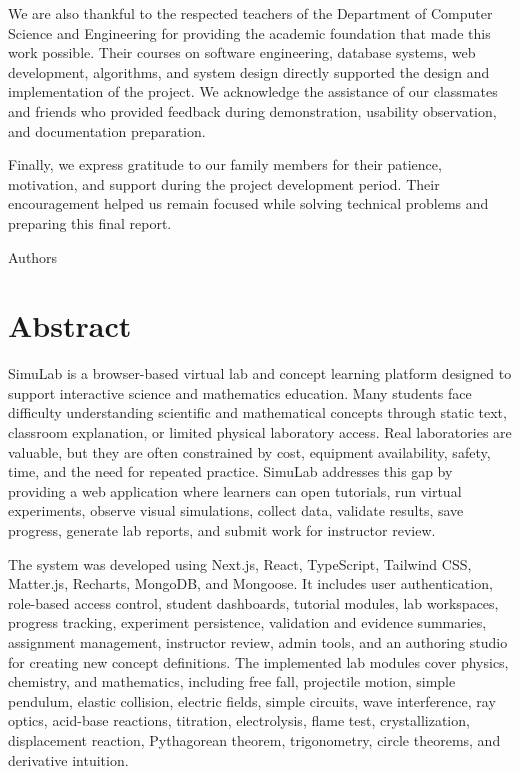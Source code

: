 \documentclass[12pt,a4paper]{report}
\begin{document}
We are also thankful to the respected teachers of the Department of Computer Science and Engineering for providing the academic foundation that made this work possible. Their courses on software engineering, database systems, web development, algorithms, and system design directly supported the design and implementation of the project. We acknowledge the assistance of our classmates and friends who provided feedback during demonstration, usability observation, and documentation preparation.

Finally, we express gratitude to our family members for their patience, motivation, and support during the project development period. Their encouragement helped us remain focused while solving technical problems and preparing this final report.

\begin{flushright}
Authors
\end{flushright}

\chapter*{Abstract}
SimuLab is a browser-based virtual lab and concept learning platform designed to support interactive science and mathematics education. Many students face difficulty understanding scientific and mathematical concepts through static text, classroom explanation, or limited physical laboratory access. Real laboratories are valuable, but they are often constrained by cost, equipment availability, safety, time, and the need for repeated practice. SimuLab addresses this gap by providing a web application where learners can open tutorials, run virtual experiments, observe visual simulations, collect data, validate results, save progress, generate lab reports, and submit work for instructor review.

The system was developed using Next.js, React, TypeScript, Tailwind CSS, Matter.js, Recharts, MongoDB, and Mongoose. It includes user authentication, role-based access control, student dashboards, tutorial modules, lab workspaces, progress tracking, experiment persistence, validation and evidence summaries, assignment management, instructor review, admin tools, and an authoring studio for creating new concept definitions. The implemented lab modules cover physics, chemistry, and mathematics, including free fall, projectile motion, simple pendulum, elastic collision, electric fields, simple circuits, wave interference, ray optics, acid-base reactions, titration, electrolysis, flame test, crystallization, displacement reaction, Pythagorean theorem, trigonometry, circle theorems, and derivative intuition.
\end{document}

